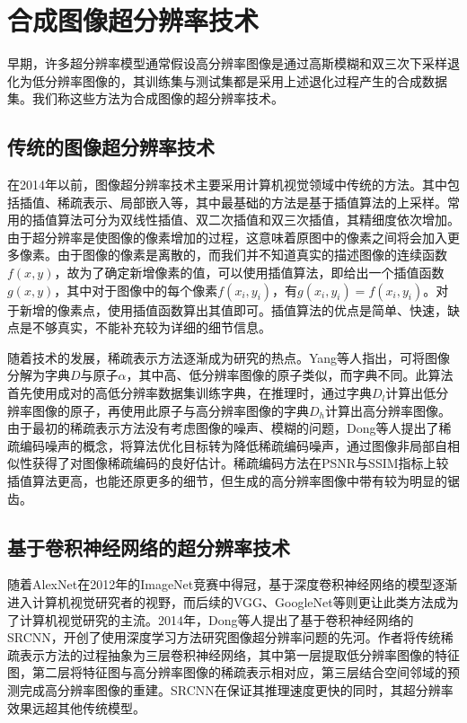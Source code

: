 \section{合成图像超分辨率技术}
早期，许多超分辨率模型通常假设高分辨率图像是通过高斯模糊和双三次下采样退化为低分辨率图像的，其训练集与测试集都是采用上述退化过程产生的合成数据集。我们称这些方法为合成图像的超分辨率技术。
\subsection{传统的图像超分辨率技术}
在2014年以前，图像超分辨率技术主要采用计算机视觉领域中传统的方法。其中包括插值、稀疏表示、局部嵌入等，其中最基础的方法是基于插值算法的上采样。常用的插值算法可分为双线性插值、双二次插值和双三次插值，其精细度依次增加。由于超分辨率是使图像的像素增加的过程，这意味着原图中的像素之间将会加入更多像素。由于图像的像素是离散的，而我们并不知道真实的描述图像的连续函数$f(x,y)$，故为了确定新增像素的值，可以使用插值算法，即给出一个插值函数$g(x,y)$，其中对于图像中的每个像素$f(x_i,y_i)$，有$g(x_i,y_i)=f(x_i,y_i)$。对于新增的像素点，使用插值函数算出其值即可。插值算法的优点是简单、快速，缺点是不够真实，不能补充较为详细的细节信息。

随着技术的发展，稀疏表示方法逐渐成为研究的热点。Yang等人\parencite{4587647}指出，可将图像分解为字典$D$与原子$\alpha$，其中高、低分辨率图像的原子类似，而字典不同。此算法首先使用成对的高低分辨率数据集训练字典，在推理时，通过字典$D_l$计算出低分辨率图像的原子，再使用此原子与高分辨率图像的字典$D_h$计算出高分辨率图像。由于最初的稀疏表示方法没有考虑图像的噪声、模糊的问题，Dong等人\parencite{6392274}提出了稀疏编码噪声的概念，将算法优化目标转为降低稀疏编码噪声，通过图像非局部自相似性获得了对图像稀疏编码的良好估计。稀疏编码方法在PSNR与SSIM\parencite{wang2002universal}指标上较插值算法更高，也能还原更多的细节，但生成的高分辨率图像中带有较为明显的锯齿。


\subsection{基于卷积神经网络的超分辨率技术}
随着AlexNet\parencite{NIPS2012_c399862d}在2012年的ImageNet竞赛中得冠，基于深度卷积神经网络的模型逐渐进入计算机视觉研究者的视野，而后续的VGG\parencite{simonyan2014very}、GoogleNet\parencite{szegedy2015going}等则更让此类方法成为了计算机视觉研究的主流。2014年，Dong等人\parencite{SRCNN}提出了基于卷积神经网络的SRCNN，开创了使用深度学习方法研究图像超分辨率问题的先河。作者将传统稀疏表示方法的过程抽象为三层卷积神经网络，其中第一层提取低分辨率图像的特征图，第二层将特征图与高分辨率图像的稀疏表示相对应，第三层结合空间邻域的预测完成高分辨率图像的重建。SRCNN在保证其推理速度更快的同时，其超分辨率效果远超其他传统模型。

